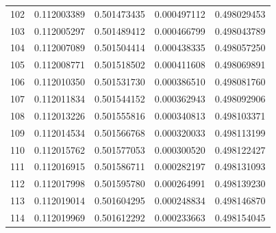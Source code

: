 \begin{tabular}{rcccc}
102 & 0.112003389 & 0.501473435 & 0.000497112 & 0.498029453 \\
103 & 0.112005297 & 0.501489412 & 0.000466799 & 0.498043789 \\
104 & 0.112007089 & 0.501504414 & 0.000438335 & 0.498057250 \\
105 & 0.112008771 & 0.501518502 & 0.000411608 & 0.498069891 \\
106 & 0.112010350 & 0.501531730 & 0.000386510 & 0.498081760 \\
107 & 0.112011834 & 0.501544152 & 0.000362943 & 0.498092906 \\
108 & 0.112013226 & 0.501555816 & 0.000340813 & 0.498103371 \\
109 & 0.112014534 & 0.501566768 & 0.000320033 & 0.498113199 \\
110 & 0.112015762 & 0.501577053 & 0.000300520 & 0.498122427 \\
111 & 0.112016915 & 0.501586711 & 0.000282197 & 0.498131093 \\
112 & 0.112017998 & 0.501595780 & 0.000264991 & 0.498139230 \\
113 & 0.112019014 & 0.501604295 & 0.000248834 & 0.498146870 \\
114 & 0.112019969 & 0.501612292 & 0.000233663 & 0.498154045 \\
\bottomrule
\end{tabular}
